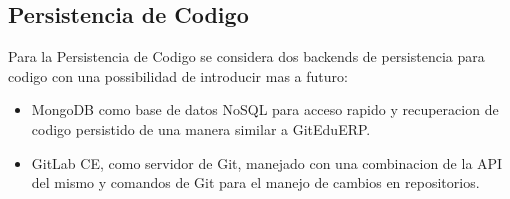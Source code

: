 
\subsection{Persistencia de Codigo}
Para la Persistencia de Codigo se considera dos backends de persistencia para codigo con una possibilidad de introducir mas a futuro:
\begin{itemize}
	\item MongoDB como base de datos NoSQL para acceso rapido y recuperacion de codigo persistido de una manera similar a GitEduERP.
    \item GitLab CE, como servidor de Git, manejado con una combinacion de la API del mismo y comandos de Git para el manejo de cambios en repositorios.
\end{itemize}

